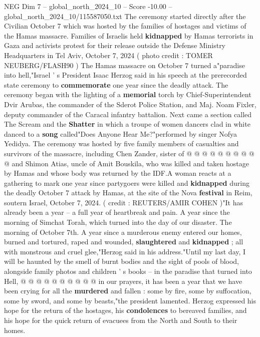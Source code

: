 \begin{textsample}{NEG Dim 7 – global\_north\_2024\_10 – Score -10.00 – global\_north\_2024\_10/115587050.txt}  \label{ex:f7_neg_039}
The ceremony started directly after the Civilian October 7 which was hosted by the families of hostages and victims of the Hamas massacre.
Families of Israelis held \textbf{kidnapped} by Hamas terrorists in Gaza and activists protest for their release outside the Defense Ministry Headquarters in Tel Aviv, October 7, 2024 ( photo credit : TOMER NEUBERG/FLASH90 ) The Hamas massacre on October 7 turned a"paradise into hell,"Israel ' s President Isaac Herzog said in his speech at the prerecorded state ceremony to \textbf{commemorate} one year since the deadly attack.
The ceremony began with the lighting of a \textbf{memorial} torch by Chief-Superintendent Dvir Arubas, the commander of the Sderot Police Station, and Maj.
Noam Fixler, deputy commander of the Caracal infantry battalion.
Next came a section called The Scream and the \textbf{Shatter} in which a troupe of women dancers clad in white danced to a \textbf{song} called"Does Anyone Hear Me?"performed by singer Nofya Yedidya.
The ceremony was hosted by five family members of casualties and survivors of the massacre, including Chen Zander, sister of @ @ @ @ @ @ @ @ @ @ and Shimon Atias, uncle of Amit Bouskila, who was killed and taken hostage by Hamas and whose body was returned by the IDF.A woman reacts at a gathering to mark one year since partygoers were killed and \textbf{kidnapped} during the deadly October 7 attack by Hamas, at the site of the Nova \textbf{festival} in Reim, soutern Israel, October 7, 2024. ( credit : REUTERS/AMIR COHEN )"It has already been a year -- a full year of heartbreak and pain.
A year since the morning of Simchat Torah, which turned into the day of our disaster.
The morning of October 7th.
A year since a murderous enemy entered our homes, burned and tortured, raped and wounded, \textbf{slaughtered} and \textbf{kidnapped} ; all with monstrous and cruel glee,"Herzog said in his address."Until my last day, I will be haunted by the smell of burnt bodies and the sight of pools of blood, alongside family photos and children ' s books -- in the paradise that turned into Hell, @ @ @ @ @ @ @ @ @ @ in our prayers, it has been a year that we have been crying for all the \textbf{murdered} and fallen : some by fire, some by suffocation, some by sword, and some by beasts,"the president lamented.
Herzog expressed his hope for the return of the hostages, his \textbf{condolences} to bereaved families, and his hope for the quick return of evacuees from the North and South to their homes.

\end{textsample}
